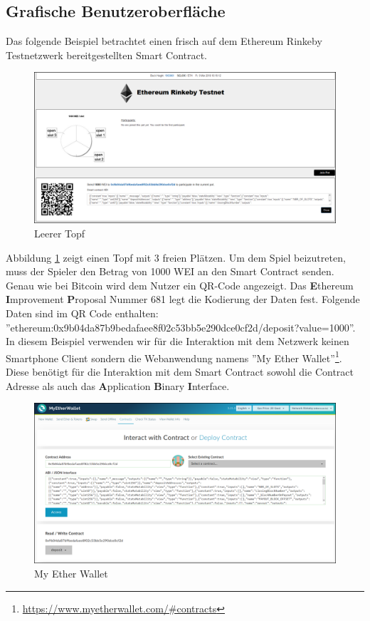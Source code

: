 \subsection{Grafische Benutzeroberfläche}
Das folgende Beispiel betrachtet einen frisch auf dem Ethereum Rinkeby Testnetzwerk bereitgestellten Smart Contract.

\begin{figure}[H]
\centering
\includegraphics[width=1\linewidth]{Figures/eth_gui/ETH_pot_empty}
\decoRule
\caption{Leerer Topf}
\label{fig:ETH_pot_empty}
\end{figure}
\noindent Abbildung \ref{fig:ETH_pot_empty} zeigt einen Topf mit 3 freien Plätzen. Um dem Spiel beizutreten, muss der Spieler den Betrag von 1000 WEI an den Smart Contract senden. Genau wie bei Bitcoin wird dem Nutzer ein QR-Code angezeigt. Das \textbf{E}thereum \textbf{I}mprovement \textbf{P}roposal Nummer 681 \cite{eip681} legt die Kodierung der Daten fest.
Folgende Daten sind im QR Code enthalten:\\ ''ethereum:0x9b04da87b9bedafaee8f02c53bb5e290dce0cf2d/deposit?value=1000''. In diesem Beispiel verwenden wir für die Interaktion mit dem Netzwerk keinen Smartphone Client sondern die Webanwendung namens ''My Ether Wallet''\footnote{\url{https://www.myetherwallet.com/\#contracts}}. Diese benötigt für die Interaktion mit dem Smart Contract sowohl die Contract Adresse als auch das \textbf{A}pplication \textbf{B}inary \textbf{I}nterface.


\begin{figure}[H]
\centering
\includegraphics[width=1\linewidth]{Figures/eth_gui/ETH_wallet}
\decoRule
\caption{My Ether Wallet}
\label{fig:ETH_wallet}
\end{figure}

